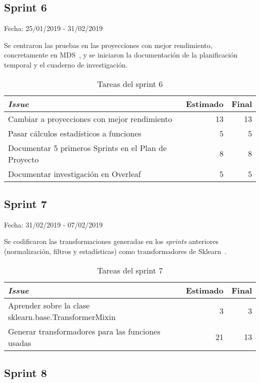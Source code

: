 \subsection{Sprint 6}

Fecha: 25/01/2019 - 31/02/2019

Se centraron las pruebas en las proyecciones con mejor rendimiento, concretamente en MDS~\cite{MDS}, y se iniciaron la documentación de la planificación temporal y el cuaderno de investigación. 

\begin{table}[H]
	\begin{tabularx}{\textwidth}{Xrr}
		\toprule \textbf{\textit{Issue}} & \textbf{Estimado} & \textbf{Final}\\
		\toprule
		Cambiar a proyecciones con mejor rendimiento & 13 & 13 \\
		Pasar cálculos estadísticos a funciones & 5 & 5 \\
		Documentar 5 primeros Sprints en el Plan de Proyecto & 8 & 8 \\
		Documentar investigación en Overleaf~\cite{overleaf} & 5 & 5 \\
		\bottomrule
	\end{tabularx}
	\caption{Tareas del sprint 6}
\end{table}

\subsection{Sprint 7}

Fecha: 31/02/2019 - 07/02/2019

Se codificaron las transformaciones generadas en los \textit{sprints} anteriores (normalización, filtros y estadísticas) como transformadores de Sklearn~\cite{scikit-learn}.

\begin{table}[H]
	\begin{tabularx}{\textwidth}{Xrr}
		\toprule \textbf{\textit{Issue}} & \textbf{Estimado} & \textbf{Final}\\
		\toprule 
		Aprender sobre la clase sklearn.base.TransformerMixin~\cite{TransformerMixin} & 3 & 3 \\
		Generar transformadores para las funciones usadas & 21 & 13 \\
		\bottomrule
	\end{tabularx}
	\caption{Tareas del sprint 7}
\end{table}

\subsection{Sprint 8}

